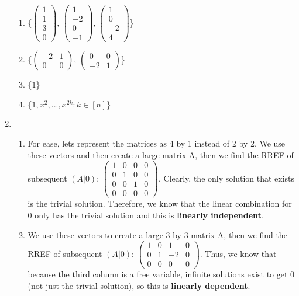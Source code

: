 \documentclass{article}
\begin{document}
\begin{enumerate}
\begin{enumerate}
\item \{$\left(\begin{array}{c} 1 \\ 1 \\ 3 \\ 0 \end{array}\right)$, $\left(\begin{array}{c} 1 \\ -2 \\ 0 \\ -1 \end{array}\right)$,
$\left(\begin{array}{c} 1 \\ 0 \\ -2 \\ 4 \end{array}\right)$\}

\item \{$\left(\begin{array}{cc} -2 & 1 \\ 0 & 0 \end{array}\right)$, $\left(\begin{array}{cc} 0 & 0 \\ -2 & 1 \end{array}\right)$\}

\item \{$1$\}

\item \{$1, x^2, ..., x^{2k}: k \in [n]$\}
\end{enumerate}

\item

\begin{enumerate}

\item For ease, lets represent the matrices as 4 by 1 instead of 2 by 2. We use these vectors and then create a large matrix A, then we find the RREF of subsequent $(A|0)$: $\left(\begin{array}{ccc|c} 1 & 0 & 0 & 0\\ 0 & 1 & 0 & 0\\ 0 & 0 & 1 & 0\\ 0 & 0 & 0 & 0\end{array}\right)$. Clearly, the only solution that exists is the trivial solution. Therefore, we know that the linear combination for 0 only has the trivial solution and this is \textbf{linearly independent}.

\item We use these vectors to create a large 3 by 3 matrix A, then we find the RREF of subsequent $(A|0)$: $\left(\begin{array}{ccc|c} 1 & 0 & 1 & 0\\ 0 & 1 & -2 & 0\\ 0 & 0 & 0 & 0\end{array}\right)$. Thus, we know that because the third column is a free variable, infinite solutions exist to get 0 (not just the trivial solution), so this is \textbf{linearly dependent}.


\end{enumerate}
\end{enumerate}
\end{document}
